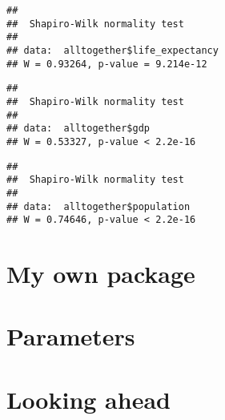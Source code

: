 \documentclass[
]{book}
\newenvironment{Shaded}{\begin{snugshade}}{\end{snugshade}}
\newcommand{\FunctionTok}[1]{\textcolor[rgb]{0.00,0.00,0.00}{#1}}
\newcommand{\NormalTok}[1]{#1}
\newcommand{\SpecialCharTok}[1]{\textcolor[rgb]{0.00,0.00,0.00}{#1}}
\begin{document}
\begin{Shaded}
\end{Shaded}

\begin{verbatim}
## 
##  Shapiro-Wilk normality test
## 
## data:  alltogether$life_expectancy
## W = 0.93264, p-value = 9.214e-12
\end{verbatim}

\begin{Shaded}
\end{Shaded}

\begin{verbatim}
## 
##  Shapiro-Wilk normality test
## 
## data:  alltogether$gdp
## W = 0.53327, p-value < 2.2e-16
\end{verbatim}

\begin{Shaded}
\end{Shaded}

\begin{verbatim}
## 
##  Shapiro-Wilk normality test
## 
## data:  alltogether$population
## W = 0.74646, p-value < 2.2e-16
\end{verbatim}

\hypertarget{my-own-package}{%
\chapter{My own package}\label{my-own-package}}

\hypertarget{parameters}{%
\chapter{Parameters}\label{parameters}}

\hypertarget{looking-ahead}{%
\chapter{Looking ahead}\label{looking-ahead}}
\end{document}

